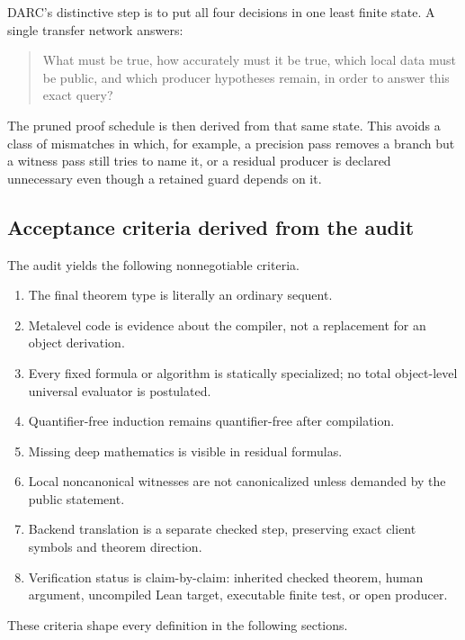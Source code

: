 DARC's distinctive step is to put all four decisions in one least finite state.
A single transfer network answers:
\begin{quote}
What must be true, how accurately must it be true, which local data must be
public, and which producer hypotheses remain, in order to answer this exact
query?
\end{quote}
The pruned proof schedule is then derived from that same state.  This avoids a
class of mismatches in which, for example, a precision pass removes a branch
but a witness pass still tries to name it, or a residual producer is declared
unnecessary even though a retained guard depends on it.

\subsection{Acceptance criteria derived from the audit}

The audit yields the following nonnegotiable criteria.
\begin{enumerate}
  \item The final theorem type is literally an ordinary 
        sequent.
  \item Metalevel code is evidence about the compiler, not a replacement for
        an object derivation.
  \item Every fixed formula or algorithm is statically specialized; no total
        object-level universal evaluator is postulated.
  \item Quantifier-free induction remains quantifier-free after compilation.
  \item Missing deep mathematics is visible in residual formulas.
  \item Local noncanonical witnesses are not canonicalized unless demanded by
        the public statement.
  \item Backend translation is a separate checked step, preserving exact
        client symbols and theorem direction.
  \item Verification status is claim-by-claim: inherited checked theorem,
        human argument, uncompiled Lean target, executable finite test, or
        open producer.
\end{enumerate}
These criteria shape every definition in the following sections.
